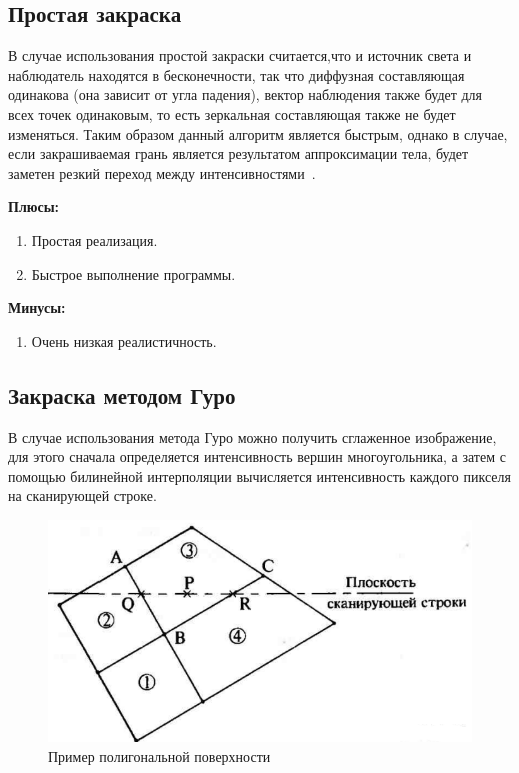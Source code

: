 \subsection{Простая закраска}
В случае использования простой закраски считается,что и источник света и наблюдатель находятся в бесконечности,
так что диффузная составляющая одинакова (она зависит от угла падения), вектор наблюдения также будет для всех точек одинаковым, то есть зеркальная составляющая также не будет изменяться. 
Таким образом данный алгоритм является быстрым, однако в случае, если закрашиваемая грань является результатом аппроксимации тела, будет заметен резкий переход между интенсивностями~\cite{Rodgers}.

\textbf{Плюсы:}
\begin{enumerate}
	\item Простая реализация.
	\item Быстрое выполнение программы.
\end{enumerate}

\textbf{Минусы:}
\begin{enumerate}
	\item Очень низкая реалистичность.
\end{enumerate}


\subsection{Закраска методом Гуро}
В случае использования метода Гуро можно получить сглаженное изображение, для этого сначала определяется интенсивность вершин многоугольника, а
затем с помощью билинейной интерполяции вычисляется интенсивность каждого пикселя на сканирующей строке.

\begin{figure}[H]
	\centering
	\includegraphics{images/guro.png}
	\caption{Пример полигональной поверхности}
	\label{fig:guro_polygon}
\end{figure} 

